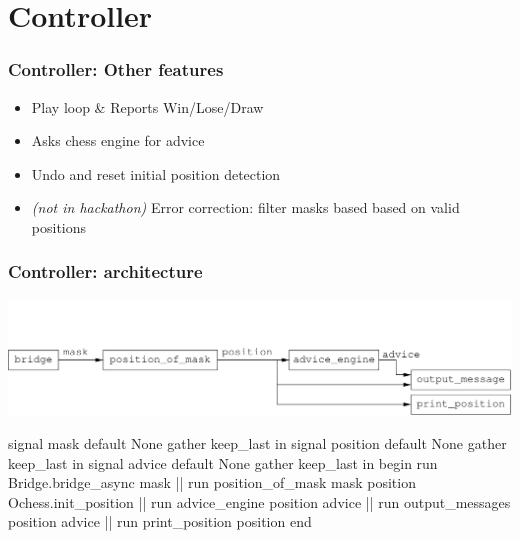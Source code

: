 \documentclass[t]{beamer}
\begin{document}
\section{Controller}

\begin{frame}[fragile]
\frametitle{Controller: Other features}

\begin{itemize}
\item Play loop \& Reports Win/Lose/Draw
\item Asks chess engine for advice
\item Undo and reset initial position detection
\item \emph{(not in hackathon)} Error correction: filter masks based based on valid positions
\end{itemize}

\end{frame}


\begin{frame}[fragile]
\frametitle{Controller: architecture}

\includegraphics[scale=0.6]{figures/controller}

\pause

\begin{lstrml}
  signal mask default None gather keep_last in
  signal position default None gather keep_last in
  signal advice default None gather keep_last in
  begin
    run Bridge.bridge_async mask ||
    run position_of_mask mask position Ochess.init_position ||
    run advice_engine position advice ||
    run output_messages position advice ||
    run print_position position
  end
\end{lstrml}

\end{frame}

\end{document}
